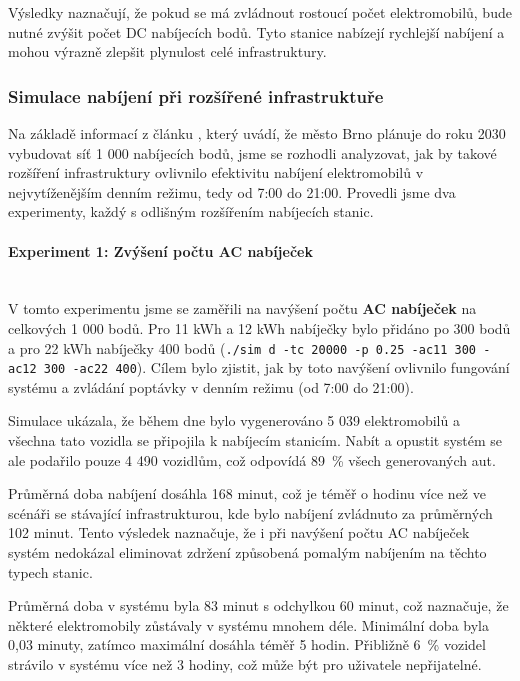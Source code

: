 \documentclass[a4paper,11pt]{article}
\begin{document}
Výsledky naznačují, že pokud se má zvládnout rostoucí počet elektromobilů, bude nutné zvýšit počet DC nabíjecích bodů. Tyto stanice nabízejí rychlejší nabíjení a mohou výrazně zlepšit plynulost celé infrastruktury.


\subsubsection{Simulace nabíjení při rozšířené infrastruktuře}

Na základě informací z článku \cite{ev_growth}, který uvádí, že město Brno plánuje do roku 2030 vybudovat síť 1 000 nabíjecích bodů, jsme se rozhodli analyzovat, jak by takové rozšíření infrastruktury ovlivnilo efektivitu nabíjení elektromobilů v nejvytíženějším denním režimu, tedy od 7:00 do 21:00. Provedli jsme dva experimenty, každý s odlišným rozšířením nabíjecích stanic.


\paragraph{Experiment 1: Zvýšení počtu AC nabíječek\\\\}
V tomto experimentu jsme se zaměřili na navýšení počtu \textbf{AC nabíječek} na celkových 1 000 bodů. Pro 11 kWh a 12 kWh nabíječky bylo přidáno po 300 bodů a pro 22 kWh nabíječky 400 bodů (\texttt{./sim d -tc 20000 -p 0.25 -ac11 300 -ac12 300 -ac22 400}). Cílem bylo zjistit, jak by toto navýšení ovlivnilo fungování systému a zvládání poptávky v denním režimu (od 7:00 do 21:00).

Simulace ukázala, že během dne bylo vygenerováno 5 039 elektromobilů a všechna tato vozidla se připojila k nabíjecím stanicím. Nabít a opustit systém se ale podařilo pouze 4 490 vozidlům, což odpovídá 89~\% všech generovaných aut.

Průměrná doba nabíjení dosáhla 168 minut, což je téměř o hodinu více než ve scénáři se stávající infrastrukturou, kde bylo nabíjení zvládnuto za průměrných 102 minut. Tento výsledek naznačuje, že i při navýšení počtu AC nabíječek systém nedokázal eliminovat zdržení způsobená pomalým nabíjením na těchto typech stanic.

Průměrná doba v systému byla 83 minut s odchylkou 60 minut, což naznačuje, že některé elektromobily zůstávaly v systému mnohem déle. Minimální doba byla 0,03 minuty, zatímco maximální dosáhla téměř 5 hodin. Přibližně 6~\% vozidel strávilo v systému více než 3 hodiny, což může být pro uživatele nepřijatelné.
\end{document}
